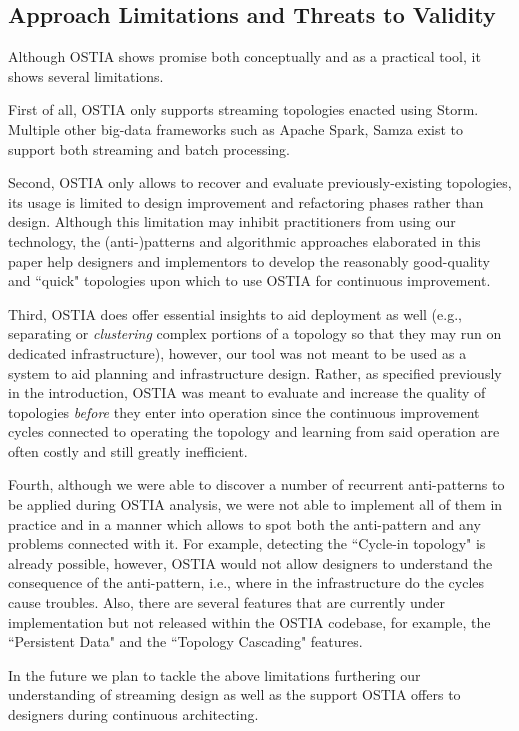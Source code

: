 \subsection{Approach Limitations and Threats to Validity}\label{lim}

Although OSTIA shows promise both conceptually and as a practical tool, it shows several limitations.

First of all, OSTIA only supports streaming topologies enacted using Storm. Multiple other big-data frameworks such as Apache Spark, Samza exist to support both streaming and batch processing. 

Second, OSTIA only allows to recover and evaluate previously-existing topologies, its usage is limited to design improvement and refactoring phases rather than design. Although this limitation may inhibit practitioners from using our technology, the (anti-)patterns and algorithmic approaches elaborated in this paper help designers and implementors to develop the reasonably good-quality and ``quick" topologies upon which to use OSTIA for continuous improvement.

Third, OSTIA does offer essential insights to aid deployment as well (e.g., separating or \emph{clustering} complex portions of a topology so that they may run on dedicated infrastructure), however, our tool was not meant to be used as a system to aid planning and infrastructure design. Rather, as specified previously in the introduction, OSTIA was meant to evaluate and increase the quality of topologies \emph{before} they enter into operation since the continuous improvement cycles connected to operating the topology and learning from said operation are often costly and still greatly inefficient.

Fourth, although we were able to discover a number of recurrent anti-patterns to be applied during OSTIA analysis, we were not able to implement all of them in practice and in a manner which allows to spot both the anti-pattern and any problems connected with it. For example, detecting the ``Cycle-in topology" is already possible, however, OSTIA would not allow designers to understand the consequence of the anti-pattern, i.e., where in the infrastructure do the cycles cause troubles. Also, there are several features that are currently under implementation but not released within the OSTIA codebase, for example, the ``Persistent Data" and the ``Topology Cascading" features.

In the future we plan to tackle the above limitations furthering our understanding of streaming design as well as the support OSTIA offers to designers during continuous architecting.

